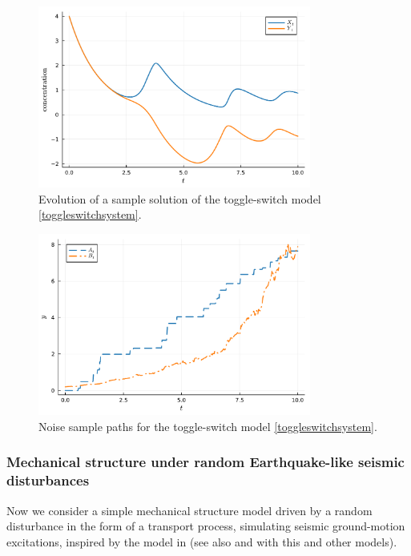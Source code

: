 \documentclass[reqno,12pt]{amsart}
\theoremstyle{plain} %
\theoremstyle{definition} %
\begin{document}
\begin{figure}[htb]
    \centerline{\includegraphics[width=0.8\textwidth]{img/evolution_toggleswitch.pdf}}
    \caption{Evolution of a sample solution of the toggle-switch model \cref{toggleswitchsystem}.}
    \label{figtoggleswitchevolution}
\end{figure}

\begin{figure}[htb]
    \centerline{\includegraphics[width=0.8\textwidth]{img/noises_toggleswitch.pdf}}
    \caption{Noise sample paths for the toggle-switch model \cref{toggleswitchsystem}.}
    \label{figtoggleswitchnoise}
\end{figure}

\subsubsection{Mechanical structure under random Earthquake-like seismic disturbances}

Now we consider a simple mechanical structure model driven by a random disturbance in the form of a transport process, simulating seismic ground-motion excitations, inspired by the model in \cite{BogdanoffGoldbergBernard1961} (see also \cite[Chapter 18]{NeckelRupp2013} and \cite{HousnerJenning1964} with this and other models).
\end{document}
